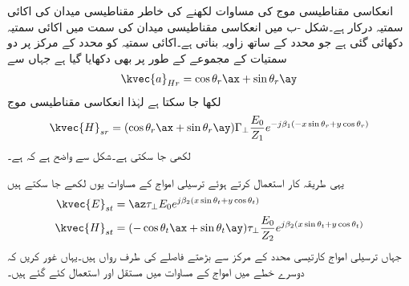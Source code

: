 انعکاسی مقناطیسی موج کی مساوات لکھنے کی خاطر مقناطیسی میدان کی اکائی سمتیہ درکار ہے۔شکل -ب میں انعکاسی مقناطیسی میدان کی سمت میں اکائی سمتیہ  دکھائی گئی ہے جو  محدد کے ساتھ  زاویہ بناتی ہے۔اکائی سمتیہ کو محدد کے مرکز پر دو سمتیات کے مجموعے کے طور پر بھی دکھایا گیا ہے جہاں سے
\begin{align}
\kvec{a}_{Hr}=\cos \theta_r \ax+\sin \theta_r \ay
\end{align}
لکھا جا سکتا ہے لہٰذا انعکاسی مقناطیسی موج
\begin{align} \label{مساوات_ترچھی_انعکاسی_مقناطیسی_میدان_دوری_سمتی}
\kvec{H}_{sr}=(\cos \theta_r \ax+\sin \theta_r \ay)\Gamma_{\perp} \frac{ E_0}{Z_1} e^{-j \beta_1 (-x \sin \theta_r+y\cos \theta_r)}
\end{align}
لکھی جا سکتی ہے۔شکل سے واضح ہے کہ  ہے۔

یہی طریقہ کار استعمال  کرتے ہوئے ترسیلی امواج کے مساوات یوں لکھے جا سکتے ہیں
\begin{align}
\kvec{E}_{st} &=\az \tau_{\perp} E_0 e^{j \beta_2 (x \sin \theta_t+y\cos \theta_t)}  \label{مساوات_ترچھی_انحرافی_برقی_میدان_دوری_سمتی}\\
\kvec{H}_{st} &=(-\cos \theta_t \ax+\sin \theta_t \ay ) \tau_{\perp} \frac{E_0}{Z_2} e^{j \beta_2 (x \sin \theta_t+y\cos \theta_t)}  \label{مساوات_ترچھی_انحرافی_مقناطیسی_میدان_دوری_سمتی}
\end{align}
جہاں ترسیلی امواج کارتیسی محدد کے مرکز سے بڑھتے فاصلے کی طرف رواں ہیں۔یہاں غور کریں کہ دوسرے خطے میں امواج کے مساوات میں مستقل  اور  استعمال کئے گئے ہیں۔

